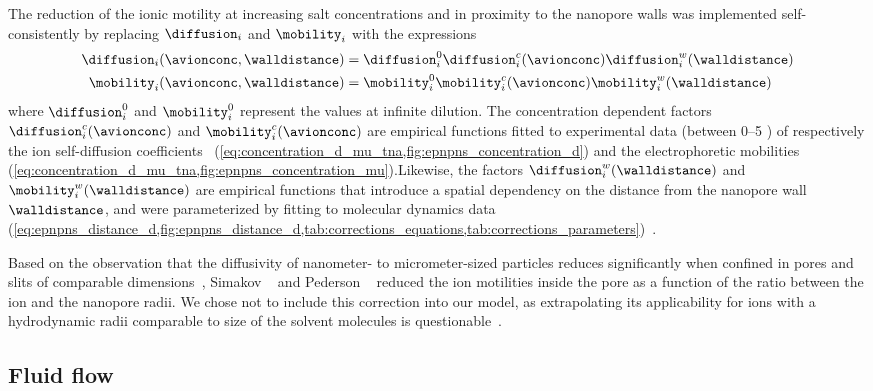 The reduction of the ionic motility at increasing salt concentrations and in proximity to the nanopore walls
was implemented self-consistently by replacing $\diffusion_{i}$ and $\mobility_{i}$ with the expressions
%
\begin{align}
  \diffusion_{i}(\avionconc,\walldistance) ={}&
      \diffusion_{i}^0 \diffusion_{i}^c(\avionconc) \diffusion_{i}^w(\walldistance)  \\
  \mobility_{i}(\avionconc,\walldistance) ={}&
      \mobility_{i}^0 \mobility_{i}^c(\avionconc) \mobility_{i}^w(\walldistance)
\end{align}
%
where $\diffusion_{i}^0$ and $\mobility_{i}^0$ represent the values at infinite dilution. The concentration
dependent factors $\diffusion_{i}^c(\avionconc)$ and $\mobility_{i}^c(\avionconc)$ are empirical functions
fitted to experimental data (between \SIrange{0}{5}{\Molar} ) of respectively the ion self-diffusion
coefficients~\cite{Mills-1989} (\cref{eq:concentration_d_mu_tna,fig:epnpns_concentration_d}) and the
electrophoretic mobilities~\cite{Bianchi-1989,Currie-1960,Goldsack-1976,DellaMonica-1979}
(\cref{eq:concentration_d_mu_tna,fig:epnpns_concentration_mu}).Likewise, the factors
$\diffusion_{i}^w(\walldistance)$ and $\mobility_{i}^w(\walldistance)$ are empirical functions that introduce
a spatial dependency on the distance from the nanopore wall $\walldistance$, and were parameterized by fitting
to molecular dynamics data
(\cref{eq:epnpns_distance_d,fig:epnpns_distance_d,tab:corrections_equations,tab:corrections_parameters})~\cite{Noskov-2004,Simakov-2010,Makarov-1998,Wilson-2019}.

Based on the observation that the diffusivity of nanometer- to micrometer-sized particles reduces
significantly when confined in pores and slits of comparable dimensions~\cite{Renkin-1954,Deen-1987,
Dechadilok-2006,Muthukumar-2014,Kannam-2017}, Simakov \etal{}~\cite{Simakov-2010} and Pederson
\etal{}~\cite{Pederson-2015} reduced the ion motilities inside the pore as a function of the ratio between the
ion and the nanopore radii. We chose not to include this correction into our model, as extrapolating its
applicability for ions with a hydrodynamic radii comparable to size of the solvent molecules is
questionable~\cite{Anderson-1972,Deen-1987}.


\subsection{Fluid flow}
%

